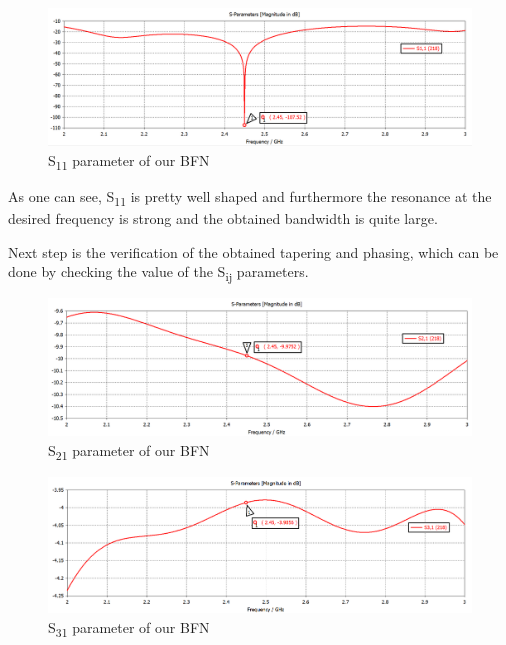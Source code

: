 \begin{figure}[H]
\centering
\includegraphics[scale=0.35]{BFN_S11.png}
\caption{S\textsubscript{11} parameter of our BFN}
\label{BFN_S11}
\end{figure}

\par\medskip
\noindent
As one can see, S\textsubscript{11} is pretty well shaped and furthermore the resonance at the desired frequency is strong and the obtained bandwidth is quite large.

\par\medskip
\noindent
Next step is the verification of the obtained tapering and phasing, which can be done by checking the value of the S\textsubscript{ij} parameters.

\begin{figure}[H]
\centering
\includegraphics[scale=0.35]{S21Amp.png}
\caption{S\textsubscript{21} parameter of our BFN}
\label{S21Amp}
\end{figure}

\begin{figure}[H]
\centering
\includegraphics[scale=0.35]{S31Amp.png}
\caption{S\textsubscript{31} parameter of our BFN}
\label{S31Amp}
\end{figure}

